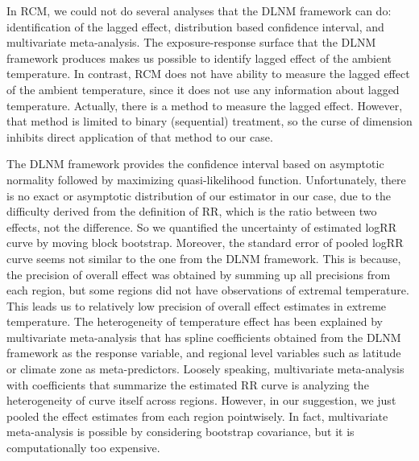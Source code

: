 \documentclass[12pt]{article}
\begin{document}
In RCM, we could not do several analyses that the DLNM framework can do:
identification of the lagged effect, 
distribution based confidence interval, and multivariate meta-analysis.
The exposure-response surface that the DLNM framework produces 
makes us possible to identify lagged effect of the ambient temperature.
In contrast, RCM does not have ability to measure the lagged effect of the ambient temperature,
since it does not use any information about lagged temperature.
Actually, there is a method to measure the lagged effect\cite{bojinov2019}.
However, that method is limited to binary (sequential) treatment,
so the curse of dimension inhibits direct application of that method to our case.

The DLNM framework provides the confidence interval based on asymptotic normality 
followed by maximizing quasi-likelihood function.
Unfortunately, there is no exact or asymptotic distribution of our estimator in our case,
due to the difficulty derived from the definition of RR, 
which is the ratio between two effects, not the difference.
So we quantified the uncertainty of estimated logRR curve by moving block bootstrap.
Moreover, the standard error of pooled logRR curve seems not similar to the one from the DLNM framework.
This is because,
the precision of overall effect was obtained by summing up all precisions from each region,
but some regions did not have observations of extremal temperature.
This leads us to relatively low precision of overall effect estimates in extreme temperature.
The heterogeneity of temperature effect has been explained by multivariate meta-analysis
that has spline coefficients obtained from the DLNM framework as the response variable, 
and regional level variables such as latitude or climate zone as meta-predictors.
Loosely speaking, multivariate meta-analysis with coefficients that summarize the estimated RR curve
is analyzing the heterogeneity of curve itself across regions.
However, in our suggestion, we just pooled the effect estimates from each region pointwisely.
In fact, multivariate meta-analysis is possible by considering bootstrap covariance,
but it is computationally too expensive.
\end{document}
